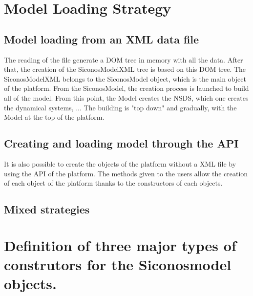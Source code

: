 \section{Model Loading Strategy}
\label{Sec:LoadingStrategy}


\subsection{Model loading from an  XML data file}

The reading of the file generate a DOM tree in memory with all the data. After that,  the creation of the SiconosModelXML tree is  based on this DOM tree.  The SiconosModelXML belongs to the SiconosModel object, which is the main object of the platform. From the SiconosModel,  the creation process is launched to build  all of the model. From this point, the Model creates the NSDS, which one creates the dynamical systems, ... The building is "top down" and gradually, with the Model at the top of the platform. 





\subsection{Creating and loading model through the API}

It is also  possible to create the objects of the platform without a XML file by using the API of the platform. The methods given to the users allow the creation of each object of the platform thanks to the constructors of each objects.


\subsection{Mixed strategies}


\section{Definition of three major types of construtors for the Siconosmodel objects.}




